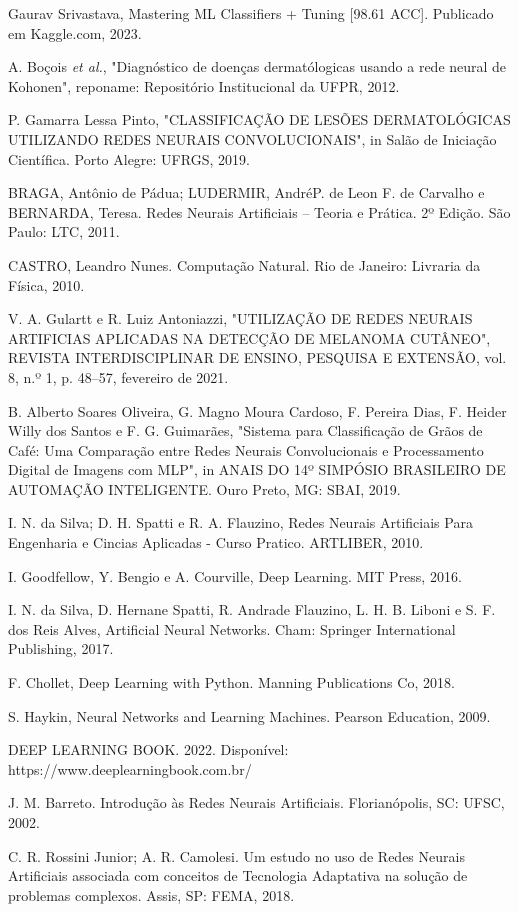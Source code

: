 \documentclass[conference]{IEEEtran}
\begin{document}
\begin{thebibliography}{00}
 Gaurav Srivastava, Mastering ML Classifiers + Tuning [98.61 ACC]. Publicado em Kaggle.com, 2023.

 A. Boçois \textit{et al.}, "Diagnóstico de doenças dermatólogicas usando a rede neural de Kohonen", reponame: Repositório Institucional da UFPR, 2012.

 P. Gamarra Lessa Pinto, "CLASSIFICAÇÃO DE LESÕES DERMATOLÓGICAS UTILIZANDO REDES NEURAIS CONVOLUCIONAIS", in Salão de Iniciação Científica. Porto Alegre: UFRGS, 2019.

 BRAGA, Antônio de Pádua; LUDERMIR, AndréP. de  Leon F. de Carvalho e  BERNARDA, Teresa. Redes Neurais Artificiais – Teoria e Prática. 2º Edição. São Paulo: LTC, 2011. 

 CASTRO, Leandro Nunes. Computação Natural. Rio de Janeiro: Livraria da Física, 2010.

 V. A. Gulartt e R. Luiz Antoniazzi, "UTILIZAÇÃO DE REDES NEURAIS ARTIFICIAS APLICADAS NA DETECÇÃO DE MELANOMA CUTÂNEO", REVISTA INTERDISCIPLINAR DE ENSINO, PESQUISA E EXTENSÃO, vol. 8, n.º 1, p. 48–57, fevereiro de 2021.

 B. Alberto Soares Oliveira, G. Magno Moura Cardoso, F. Pereira Dias, F. Heider Willy dos Santos e F. G. Guimarães, "Sistema para Classificação de Grãos de Café: Uma Comparação entre Redes Neurais Convolucionais e Processamento Digital de Imagens com MLP", in ANAIS DO 14º SIMPÓSIO BRASILEIRO DE AUTOMAÇÃO INTELIGENTE. Ouro Preto, MG: SBAI, 2019.

 I. N. da Silva; D. H. Spatti e R. A. Flauzino, Redes Neurais Artificiais Para Engenharia e Cincias Aplicadas - Curso Pratico. ARTLIBER, 2010.

 I. Goodfellow, Y. Bengio e A. Courville, Deep Learning. MIT Press, 2016.

 I. N. da Silva, D. Hernane Spatti, R. Andrade Flauzino, L. H. B. Liboni e S. F. dos Reis Alves, Artificial Neural Networks. Cham: Springer International Publishing, 2017.

 F. Chollet, Deep Learning with Python. Manning Publications Co, 2018.

 S. Haykin, Neural Networks and Learning Machines. Pearson Education, 2009.

 DEEP LEARNING BOOK. 2022. Disponível: https://www.deeplearningbook.com.br/

 J. M. Barreto. Introdução às Redes Neurais Artificiais. Florianópolis, SC: UFSC, 2002.

 C. R. Rossini Junior; A. R. Camolesi. Um estudo no uso de Redes Neurais Artificiais associada com conceitos de Tecnologia Adaptativa na solução de problemas complexos. Assis, SP: FEMA, 2018.

\end{thebibliography}
\end{document}
